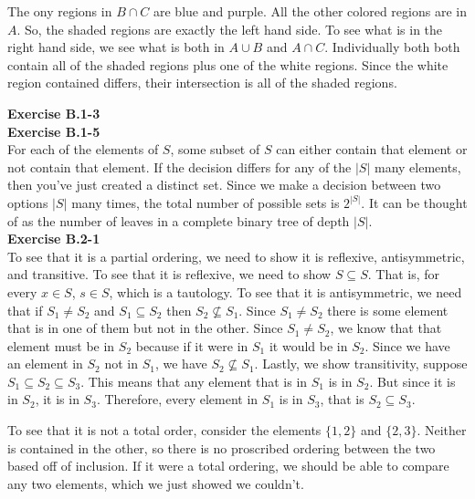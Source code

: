 \documentclass{article}
\begin{document}
The ony regions in $B\cap C$ are blue and purple. All the other colored regions are in $A$. So, the shaded regions are exactly the left hand side. To see what is in the right hand side, we see what is both in $A\cup B$ and $A\cap C$. Individually both both contain all of the shaded regions plus one of the white regions. Since the white region contained differs, their intersection is all of the shaded regions.

\noindent\textbf{Exercise B.1-3}\\

\noindent\textbf{Exercise B.1-5}\\
For each of the elements of $S$, some subset of $S$ can either contain that element or not contain that element. If the decision differs for any of the $|S|$ many elements, then you've just created a distinct set. Since we make a decision between two options $|S|$ many times, the total number of possible sets is $2^{|S|}$. It can be thought of as the number of leaves in a complete binary tree of depth $|S|$.\\

\noindent\textbf{Exercise B.2-1}\\
To see that it is a partial ordering, we need to show it is reflexive, antisymmetric, and transitive. To see that it is reflexive, we need to show $S\subseteq S$. That is, for every $x\in S$, $s\in S$, which is a tautology. To see that it is antisymmetric, we need that if $S_1 \neq S_2$ and $S_1 \subseteq S_2$ then $S_2 \not \subseteq S_1$. Since $S_1\neq S_2$ there is some element that is in one of them but not in the other. Since $S_1 \neq S_2$, we know that that element must be in $S_2$ because if it were in $S_1$ it would be in $S_2$. Since we have an element in $S_2$ not in $S_1$, we have $S_2 \not\subseteq S_1$. Lastly, we show transitivity, suppose $S_1 \subseteq S_2 \subseteq S_3$. This means that any element that is in $S_1$ is in $S_2$. But since it is in $S_2$, it is in $S_3$. Therefore, every element in $S_1$ is in $S_3$, that is $S_2 \subseteq S_3$.


To see that it is not a total order, consider the elements $\{1,2\}$ and $\{2,3\}$. Neither is contained in the other, so there is no proscribed ordering between the two based off of inclusion. If it were a total ordering, we should be able to compare any two elements, which we just showed we couldn't.\\
\end{document}
